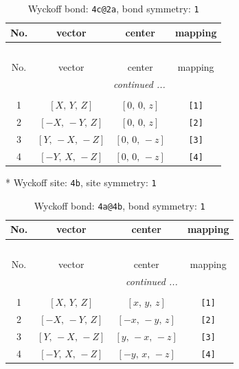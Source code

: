 \documentclass[fleqn,8pt]{jsarticle}
\begin{document}
\renewcommand{\arraystretch}{1.2}
\begin{longtable}{cccc}
\caption{Wyckoff bond: {\tt 4c@2a}, bond symmetry: {\tt 1}}
 \\
 \hline \hline
No. & vector & center & mapping \\ \hline \endfirsthead

\multicolumn{3}{l}{\tablename\ \thetable{}} \\
 \hline \hline
No. & vector & center & mapping \\ \hline \endhead

 \hline \hline
\multicolumn{3}{r}{\footnotesize\it continued ...} \\ \endfoot

 \hline \hline
\multicolumn{3}{r}{} \\ \endlastfoot

1 & $\left[ X,\, Y,\, Z \right]$ & $\left[ 0,\, 0,\, z \right]$ & {\tt [1]} \\ \hline
2 & $\left[ - X,\, - Y,\, Z \right]$ & $\left[ 0,\, 0,\, z \right]$ & {\tt [2]} \\ \hline
3 & $\left[ Y,\, - X,\, - Z \right]$ & $\left[ 0,\, 0,\, - z \right]$ & {\tt [3]} \\ \hline
4 & $\left[ - Y,\, X,\, - Z \right]$ & $\left[ 0,\, 0,\, - z \right]$ & {\tt [4]} \\
\end{longtable}
* Wyckoff site: {\tt 4b}, site symmetry: {\tt 1}
\renewcommand{\arraystretch}{1.2}
\begin{longtable}{cccc}
\caption{Wyckoff bond: {\tt 4a@4b}, bond symmetry: {\tt 1}}
 \\
 \hline \hline
No. & vector & center & mapping \\ \hline \endfirsthead

\multicolumn{3}{l}{\tablename\ \thetable{}} \\
 \hline \hline
No. & vector & center & mapping \\ \hline \endhead

 \hline \hline
\multicolumn{3}{r}{\footnotesize\it continued ...} \\ \endfoot

 \hline \hline
\multicolumn{3}{r}{} \\ \endlastfoot

1 & $\left[ X,\, Y,\, Z \right]$ & $\left[ x,\, y,\, z \right]$ & {\tt [1]} \\ \hline
2 & $\left[ - X,\, - Y,\, Z \right]$ & $\left[ - x,\, - y,\, z \right]$ & {\tt [2]} \\ \hline
3 & $\left[ Y,\, - X,\, - Z \right]$ & $\left[ y,\, - x,\, - z \right]$ & {\tt [3]} \\ \hline
4 & $\left[ - Y,\, X,\, - Z \right]$ & $\left[ - y,\, x,\, - z \right]$ & {\tt [4]} \\
\end{longtable}
\end{document}
